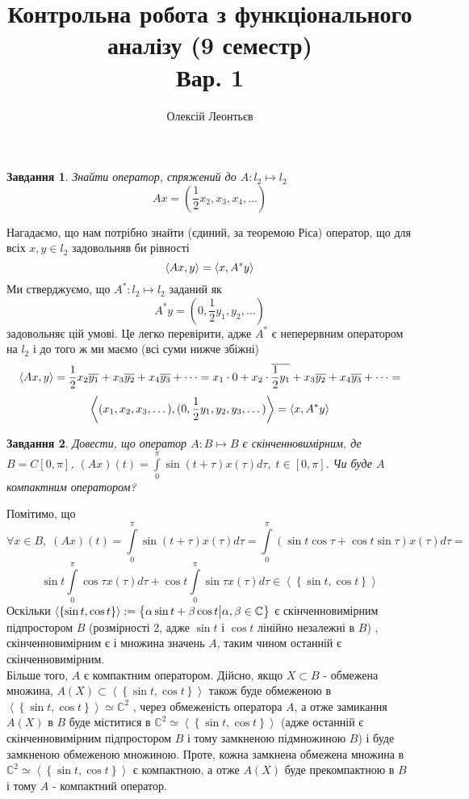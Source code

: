 \documentclass[12pt]{article} %
\title{Контрольна робота з функціонального аналізу (9 семестр)\\Вар. 1}
\author{Олексій Леонтьєв}
\newtheorem{prob}{Завдання}
\let\oldint\int
\renewcommand{\int}{\oldint\limits}
\begin{document}
\maketitle
\begin{prob}Знайти оператор, спряжений до $A:l_2\mapsto l_2$\[Ax=(\frac{1}{2}x_2,x_3,x_4,\dots)\]\end{prob}
	Нагадаємо, що нам потрібно знайти (єдиний, за теоремою Ріса) оператор, що для всіх $x,y\in l_2$ задовольняв би рівності
	\[\left<Ax,y\right>=\left<x,A^*y\right>\]
	Ми стверджуємо, що $A^*:l_2\mapsto l_2$ заданий як
	\[A^*y=(0,\frac{1}{2}y_1,y_2,\dots)\]
	задовольняє цій умові. Це легко перевірити, адже $A^*$ є неперервним оператором на $l_2$ і до того ж ми маємо (всі суми нижче збіжні)
	\[\left<Ax,y\right>=
	\frac{1}{2}x_2\overline{y_1}+x_3\overline{y_2}+x_4\overline{y_3}+\dots=
	x_1\cdot 0+x_2\cdot\overline{\frac{1}{2}y_1}+x_3\overline{y_2}+x_4\overline{y_3}+\dots=\]
	\[\left<(x_1,x_2,x_3,\dots),(0,\frac{1}{2}y_1,y_2,y_3,\dots)\right>=\left<x,A^*y\right>\]
\begin{prob}Довести, що оператор $A:B\mapsto B$ є скінченновимірним, де $B=C[0,\pi]$, $(Ax)(t)=\int_0^{\pi}\sin(t+\tau)x(\tau)d\tau,\;t\in[0,\pi]$.
	Чи буде $A$ компактним оператором?\end{prob}
	Помітимо, що
	\[\forall x\in B,\;(Ax)(t)=\int_0^{\pi}\sin(t+\tau)x(\tau)d\tau=\int_0^{\pi}\left(\sin t\cos\tau+\cos t\sin\tau\right)x(\tau)d\tau=\]
	\[\sin t\int_0^{\pi}\cos\tau x(\tau)d\tau+\cos t\int_0^{\pi}\sin\tau x(\tau)d\tau\in \left<\left\{\sin t,\cos t\right\}\right>\]
	Оскільки $\left<\left\{\sin t,\cos t\right\}\right>:=\left\{\alpha\sin t+\beta\cos t\big| \alpha,\beta\in\mathbb{C}\right\}$ є скінченновимірним
	підпростором $B$ (розмірності 2, адже $\sin t$ і $\cos t$ лінійно незалежні в $B$)
	, скінченновимірним є і множина значень $A$, таким чином останній є скінченновимірним.\\
	Більше того, $A$ є компактним оператором. Дійсно, якщо $X\subset B$ - обмежена множина, $A(X)\subset
	\left<\left\{\sin t,\cos t\right\}\right>$ також буде обмеженою в $\left<\left\{\sin t,\cos t\right\}\right>\simeq \mathbb{C}^2$
	, через обмеженість оператора $A$, а отже замикання $A(X)$ в $B$ буде міститися в $\mathbb{C}^2\simeq
	\left<\left\{\sin t,\cos t\right\}\right>$
	(адже останній є скінченновимірним підпростором $B$ і тому замкненою підмножиною $B$) і буде замкненою обмеженою множиною. Проте, 
	кожна замкнена обмежена множина в $\mathbb{C}^2\simeq
	\left<\left\{\sin t,\cos t\right\}\right>$ є компактною, а отже $A(X)$ буде прекомпактною в $B$ і тому $A$ - компактний оператор.
\end{document}
